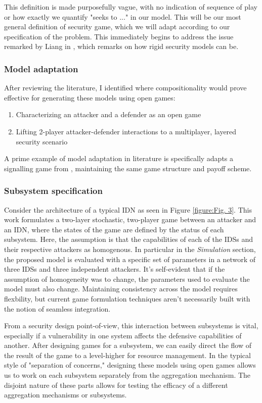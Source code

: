 This definition is made purposefully vague, with no indication of sequence of play or how exactly we quantify "seeks to ..." in our model. This will be our most general definition of security game, which we will  adapt according to our specification of the problem. This immediately begins to address the issue remarked by Liang in \cite{Liang2013}, which remarks on how rigid security models can be. 

\subsubsection{Model adaptation}
After reviewing the literature, I identified where compositionality would prove effective for generating these models using open games: 

\begin{enumerate}
	\item Characterizing an attacker and a defender as an open game
	\item Lifting 2-player attacker-defender interactions to a multiplayer, layered security scenario
\end{enumerate}

A prime example of model adaptation in literature is \cite{Pawlick2015} specifically adapts a signalling game from \cite{Carroll2009}, maintaining the same game structure and payoff scheme. 

\subsubsection{Subsystem specification}
Consider the architecture of a typical IDN as seen in Figure \ref{figure:Fig. 3}. This work formulates a two-layer stochastic, two-player game between an attacker and an IDN, where the states of the game are defined by the status of each subsystem. Here, the assumption is that the capabilities of each of the IDSs and their respective attackers as homogenous. In particular in the \textit{Simulation} section, the proposed model is evaluated with a specific set of parameters in a network of three IDSs and three independent attackers. It's self-evident that if the assumption of homogeneity was to change, the parameters used to evaluate the model must also change. Maintaining consistency across the model requires flexbility, but current game formulation techniques aren't necessarily built with the notion of seamless integration.

From a security design point-of-view, this interaction between subsystems is vital, especially if a vulnerability in one system affects the defensive capabilities of another. After designing games for a subsystem, we can easily direct the flow of the result of the game to a level-higher for resource management. In the typical style of "separation of concerns," designing these models using open games allows us to work on each subsystem separately from the aggregation mechanism. The disjoint nature of these parts allows for testing the efficacy of a different aggregation mechanisms or subsystems. 


